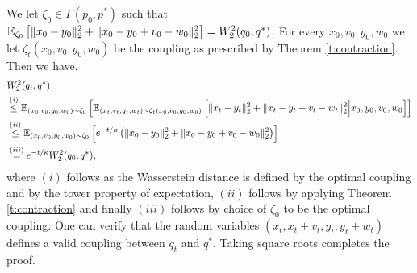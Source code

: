 \begin{Proof} We let $\zeta_0 \in \Gamma(p_0,p^*)$ such that $\mathbb{E}_{\zeta_0}\left[\lVert x_0 - y_0 \rVert_2^2 + \| x_0 - y_0 + v_0 -w_0 \|_2^2 \right] = W_2^2(q_0,q^*)$. %
For every $x_0,v_0,y_0,w_0$ we let $\zeta_t(x_0,v_0,y_0,w_0)$ be the coupling as prescribed by Theorem \ref{t:contraction}. Then we have,%
\begin{align*}
& W_2^2(q_t,q^*)\\ 
& \overset{(i)}{\le} \mathbb{E}_{(x_0,v_0,y_0,w_0)\sim\zeta_0}\left[\mathbb{E}_{(x_t,v_t,y_t,w_t)\sim\zeta_t(x_0,v_0,y_0,w_0)}\left[ \lVert x_t - y_t \rVert_2^2 + \lVert x_t - y_t+v_t-w_t\rVert_2^2 \Big\lvert x_0,y_0,v_0,w_0   \right] \right] \\
& \overset{(ii)}{\le}  \mathbb{E}_{(x_0,v_0,y_0,w_0)\sim\zeta_0}\left[e^{-t/\kappa}\left(\lVert x_0 - y_0 \rVert_2^2 + \lVert x_0 - y_0+v_0-w_0\rVert_2^2 \right)\right] \\
& \overset{(iii)}{=} e^{-t/\kappa}W^2_2(q_0,q^*),
\end{align*}
where $(i)$ follows as the Wasserstein distance is defined by the optimal coupling and by the tower property of expectation, $(ii)$ follows by applying Theorem \ref{t:contraction} and finally $(iii)$ follows by choice of $\zeta_0$ to be the optimal coupling. One can verify that the random variables $(x_t, x_t+v_t, y_t, y_t+w_t)$ defines a valid coupling between $q_t$ and $q^*$. Taking square roots completes the proof.
\end{Proof}
